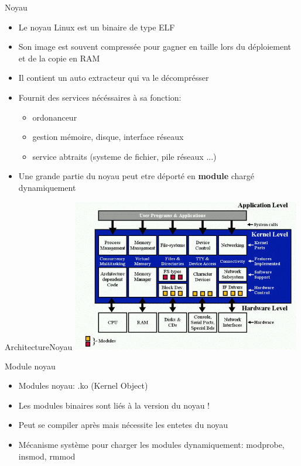 \begin{frame}{Noyau}{}
  \begin{itemize}
  \item Le noyau Linux est un binaire de type ELF
  \item Son image est souvent compressée pour gagner en taille lors du déploiement et de la copie en RAM
  \item Il contient un auto extracteur qui va le décomprésser
  \item Fournit des services nécéssaires à sa fonction:
    \begin{itemize}
    \item ordonanceur
    \item gestion mémoire, disque, interface réseaux
    \item service abtraits (systeme de fichier, pile réseaux ...)
    \end{itemize}
  \item Une grande partie du noyau peut etre déporté en \textbf{module} chargé dynamiquement
  \end{itemize}
\end{frame}

\begin{frame}{Architecture}{Noyau}
  \includegraphics[width=10cm]{pictures/kernel_arch.png}
\end{frame}

\begin{frame}{Module noyau}
  \begin{itemize}
  \item Modules noyau: .ko (Kernel Object)
  \item Les modules binaires sont liés à la version du noyau !
  \item Peut se compiler après mais nécessite les entetes du noyau
  \item Mécanisme système pour charger les modules dynamiquement: modprobe, insmod, rmmod
  \end{itemize}
\end{frame}

